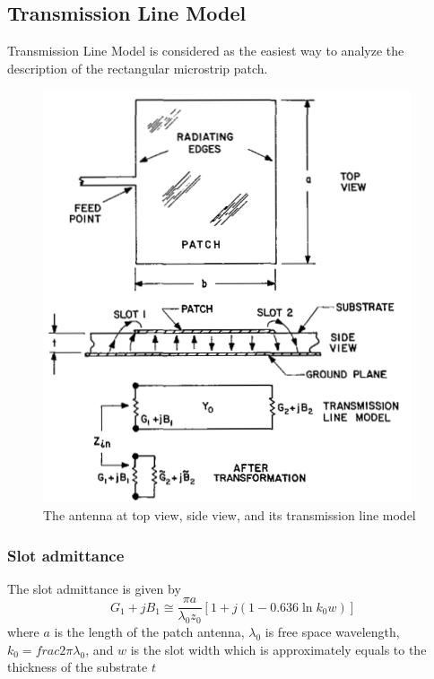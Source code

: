 \documentclass[11pt,a4paper,hidelinks]{article}
\begin{document}
  \newpage

    \subsection{Transmission Line Model}
      \indent Transmission Line Model is considered as the easiest way to analyze the description of the
              rectangular microstrip patch.
      \begin{figure}[ht]
        \includegraphics{tmmodel.png}
          \centering
          \caption{The antenna at top view, side view, and its transmission line model\cite{CaM:81}}
      \end{figure}

      \subsubsection{Slot admittance}
        \indent The slot admittance is given by \cite{CaM:81}
        \begin{equation}
          G_1 + jB_1 \cong \frac{\pi {a}}{\lambda_0 z_0}[1 + j(1-0.636\ln{k_0w})]
        \end{equation}
        \indent where $a$ is the length of the patch antenna, $\lambda_0$ is free space wavelength,
                $k_0 = frac{2\pi}{\lambda_0}$, and $w$ is the slot width which is approximately
                equals to the thickness of the substrate $t$ 
\end{document}
